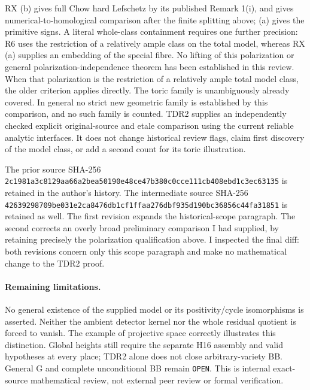RX (b) gives full Chow hard Lefschetz by its published Remark 1(i),
and gives numerical-to-homological comparison after the finite splitting
above; (a) gives the primitive signs. A literal whole-class containment
requires one further precision: R6 uses the restriction of a relatively
ample class on the total model, whereas RX (a) supplies an embedding of
the special fibre. No lifting of this polarization or general
polarization-independence theorem has been established in this review.
When that polarization is the restriction of a relatively ample total
model class, the older criterion applies directly. The toric family is
unambiguously already covered. In general no strict new geometric
family is established by this comparison, and no such family is counted.
TDR2 supplies an independently checked explicit original-source and etale
comparison using the current reliable analytic interfaces. It does not
change historical review flags, claim first discovery of the model class,
or add a second count for its toric illustration.

The prior source SHA-256
\texttt{2c1981a3c8129aa66a2bea50190e48ce47b380c0cce111cb408ebd1c3ec63135}
is retained in the author's history. The intermediate source SHA-256
\texttt{42639298709be031e2ca8476db1cf1ffaa276dbf935d190bc36856c44fa31851}
is retained as well. The first revision expands the historical-scope
paragraph. The second corrects an overly broad preliminary comparison
I had supplied, by retaining precisely the polarization qualification
above. I inspected the final diff: both revisions concern only this
scope paragraph and make no mathematical change to the TDR2 proof.

\paragraph{Remaining limitations.}
No general existence of the supplied model or its positivity/cycle
isomorphisms is asserted. Neither the ambient detector kernel nor the
whole residual quotient is forced to vanish. The example of projective
space correctly illustrates this distinction. Global heights still
require the separate H16 assembly and valid hypotheses at every place;
TDR2 alone does not close arbitrary-variety BB. General G and complete
unconditional BB remain \texttt{OPEN}. This is internal exact-source
mathematical review, not external peer review or formal verification.
